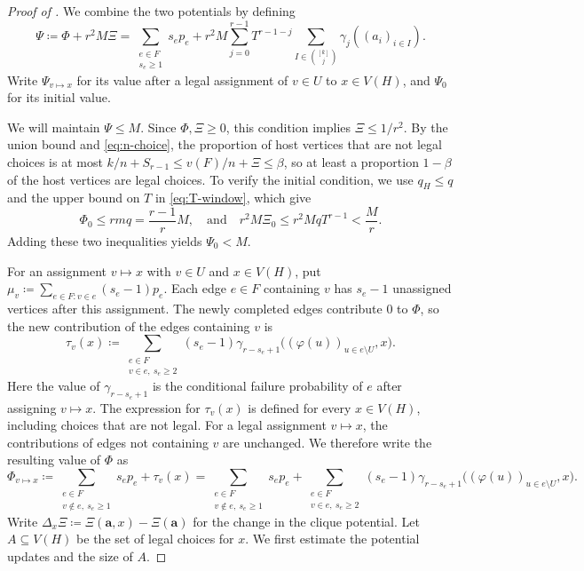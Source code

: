 \documentclass[10pt]{article}
\numberwithin{equation}{section}
\begin{document}
\begin{proof}[Proof of ]
We combine the two potentials by defining
\[
\Psi\coloneqq\Phi+r^2M\Xi
=
\sum_{\substack{e\in F\\s_e\ge1}}s_ep_e
+r^2M\sum_{j=0}^{r-1}T^{r-1-j}
\sum_{I\in\binom{[k]}j}\gamma_j((a_i)_{i\in I}).
\]
Write $\Psi_{v\mapsto x}$ for its value after a legal assignment of $v\in U$ to $x\in V(H)$, and $\Psi_0$ for its initial value.

We will maintain $\Psi\le M$. Since $\Phi,\Xi\ge0$, this condition implies $\Xi\le1/r^2$. By the union bound and \eqref{eq:n-choice}, the proportion of host vertices that are not legal choices is at most $k/n+S_{r-1}\le v(F)/n+\Xi\le\beta$, so at least a proportion $1-\beta$ of the host vertices are legal choices. To verify the initial condition, we use $q_H\le q$ and the upper bound on $T$ in \eqref{eq:T-window}, which give
\[
\Phi_0\le rmq=\frac{r-1}{r}M,
\quad\text{and}\quad
r^2M\Xi_0\le r^2MqT^{r-1}<\frac Mr.
\]
Adding these two inequalities yields $\Psi_0<M$.

For an assignment $v\mapsto x$ with $v\in U$ and $x\in V(H)$, put $\mu_v\coloneqq\sum_{e\in F\colon v\in e}(s_e-1)p_e$. Each edge $e\in F$ containing $v$ has $s_e-1$ unassigned vertices after this assignment. The newly completed edges contribute $0$ to $\Phi$, so the new contribution of the edges containing $v$ is
\[
\tau_v(x)\coloneqq
\sum_{\substack{e\in F\\v\in e,\ s_e\ge2}}
(s_e-1)\gamma_{r-s_e+1}\bigl((\varphi(u))_{u\in e\setminus U},x\bigr).
\]
Here the value of $\gamma_{r-s_e+1}$ is the conditional failure probability of $e$ after assigning $v\mapsto x$. The expression for $\tau_v(x)$ is defined for every $x\in V(H)$, including choices that are not legal. For a legal assignment $v\mapsto x$, the contributions of edges not containing $v$ are unchanged. We therefore write the resulting value of $\Phi$ as
\[
\Phi_{v\mapsto x}\coloneqq
\sum_{\substack{e\in F\\v\notin e,\ s_e\ge1}}s_ep_e+\tau_v(x)
= \sum_{\substack{e\in F\\v\notin e,\ s_e\ge1}}s_ep_e + \sum_{\substack{e\in F\\v\in e,\ s_e\ge2}}
(s_e-1)\gamma_{r-s_e+1}\bigl((\varphi(u))_{u\in e\setminus U},x\bigr).
\]
Write $\Delta_x\Xi\coloneqq\Xi(\mathbf a,x)-\Xi(\mathbf a)$ for the change in the clique potential. Let $A\subseteq V(H)$ be the set of legal choices for $x$. We first estimate the potential updates and the size of $A$.


\end{proof}
\end{document}
